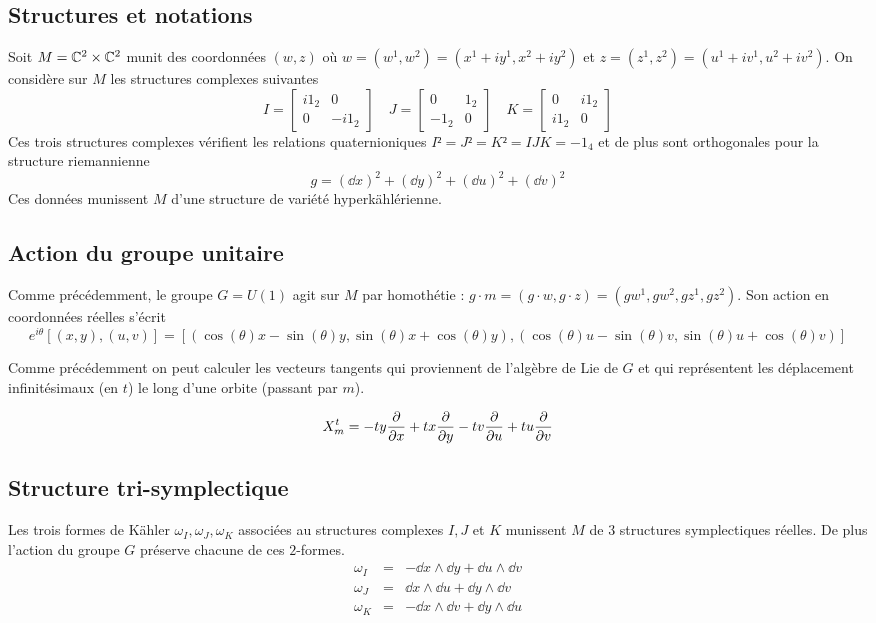 \documentclass[a4paper,10pt]{article}
\begin{document}
\subsection{Structures et notations}
Soit $M = \mathbb{C}^2 \times \mathbb{C}^2$ munit des coordonnées $(w,z)$ où $w = (w^1,w^2) = (x^1 + i y^1, x^2 + i y^2)$ et $z = (z^1,z^2) = (u^1 + i v^1, u^2 + i v^2)$.
On considère sur $M$ les structures complexes suivantes
\[
I = 
\begin{bmatrix}
i1_2 & 0 \\
0 & -i1_2
\end{bmatrix}
\quad
J = 
\begin{bmatrix}
0 & 1_2 \\
-1_2 & 0
\end{bmatrix}
\quad
K = 
\begin{bmatrix}
0 & i1_2 \\
i1_2 & 0
\end{bmatrix}
\]
Ces trois structures complexes vérifient les relations quaternioniques $I² = J² = K² = IJK = -1_4$ et de plus sont orthogonales pour la structure riemannienne
\[
g = (\dd x)^2 + (\dd y)^2 + (\dd u)^2 + (\dd v)^2
\]
Ces données munissent $M$ d'une structure de variété hyperkählérienne.

\subsection{Action du groupe unitaire}
Comme précédemment, le groupe $G = U(1)$ agit sur $M$ par homothétie : $g\cdot m = (g \cdot w, g \cdot z) = (gw^1,gw^2,gz^1,gz^2)$.
Son action en coordonnées réelles s'écrit
\[
e^{i\theta}[(x,y),(u,v)] = \left[(\cos(\theta)x-\sin(\theta)y,\sin(\theta)x+\cos(\theta)y),(\cos(\theta)u-\sin(\theta)v,\sin(\theta)u+\cos(\theta)v)\right]
\]

Comme précédemment on peut calculer les vecteurs tangents qui proviennent de l'algèbre de Lie de $G$ et qui représentent les déplacement infinitésimaux (en $t$) le long d'une orbite (passant par $m$).

\[
X_m^t = -ty\dfrac{\partial{}}{\partial{x}} + tx\dfrac{\partial{}}{\partial{y}} - tv\dfrac{\partial{}}{\partial{u}} + tu\dfrac{\partial{}}{\partial{v}}
\]

\subsection{Structure tri-symplectique}
Les trois formes de Kähler $\omega_I,\omega_J,\omega_K$ associées au structures complexes $I,J$ et $K$ munissent $M$ de $3$ structures symplectiques réelles. De plus l'action du groupe $G$ préserve chacune de ces $2$-formes.
\begin{eqnarray*}
\omega_I & = & -\dd x \wedge \dd y + \dd u \wedge \dd v\\
\omega_J & = & \dd x \wedge \dd u + \dd y \wedge \dd v\\
\omega_K & = & -\dd x \wedge \dd v + \dd y \wedge \dd u
\end{eqnarray*}
\end{document}
